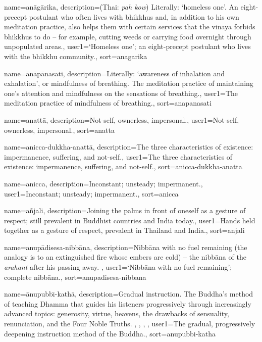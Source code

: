 {
name=an\=ag\=arika,
description={(Thai: \textit{pah kow}) Literally: `homeless one'. An eight-precept postulant who often lives with bhikkhus and, in addition to his own meditation practice, also helps them with certain services that the vinaya forbids bhikkhus to do -- for example, cutting weeds or carrying food overnight through unpopulated areas.},
user1={`Homeless one'; an eight-precept postulant who lives with the bhikkhu community.},
sort={anagarika}
}

{
name={\=an\=ap\=anasati},
description={Literally: `awareness of inhalation and exhalation', or mindfulness of breathing. The meditation practice of maintaining one's attention and mindfulness on the sensations of breathing.},
user1={The meditation practice of mindfulness of breathing.},
sort={anapanasati}
}

{
name=anatt\=a,
description={Not-self, ownerless, impersonal.},
user1={Not-self, ownerless, impersonal.},
sort={anatta}
}

{
name=anicca-dukkha-anatt\=a,
description={The three characteristics of existence: impermanence, suffering, and not-self.},
user1={The three characteristics of existence: impermanence, suffering, and not-self.},
sort={anicca-dukkha-anatta}
}

{
name=anicca,
description={Inconstant; unsteady; impermanent.},
user1={Inconstant; unsteady; impermanent.},
sort={anicca}
}

{
name=a\~njali,
description={Joining the palms in front of oneself as a gesture of respect; still prevalent in Buddhist countries and India today.},
user1={Hands held together as a gesture of respect, prevalent in Thailand and India.},
sort={anjali}
}

{
name={anup\=adisesa-nibb\=ana},
description={Nibb\=ana with no fuel remaining (the analogy is to an extinguished fire whose embers are cold) -- the nibb\=ana of the \textit{arahant} after his passing away. \protect \seepre %
\protect {}%
\protect \seepost %
},
user1={`Nibb\=ana with no fuel remaining'; complete nibb\=ana.},
sort={anupadisesa-nibbana}
}

{
name={\=anupubb\={\i}-kath\=a},
description={Gradual instruction. The Buddha's method of teaching Dhamma that guides his listeners progressively through increasingly advanced topics: generosity, virtue, heavens, the drawbacks of sensuality, renunciation, and the Four Noble Truths. \protect \seepre %
\protect {}, \protect {}, \protect {}, \protect {}%
\protect \seepost %
},
user1={The gradual, progressively deepening instruction method of the Buddha.},
sort={anupubbi-katha}
}

